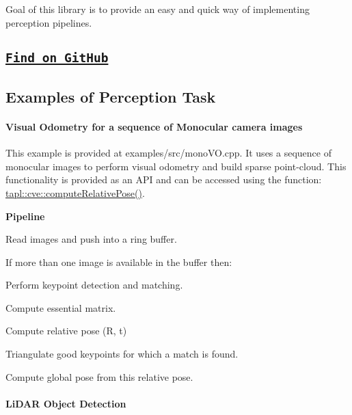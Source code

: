 Goal of this library is to provide an easy and quick way of implementing perception pipelines.



\subsection*{\href{https://github.com/towardsautonomy/TAPL}{\tt {\bfseries Find on Git\+Hub}}}

\subsection*{Examples of Perception Task}

\paragraph*{Visual Odometry for a sequence of Monocular camera images}

This example is provided at {\ttfamily examples/src/mono\+V\+O.\+cpp}. It uses a sequence of monocular images to perform visual odometry and build sparse point-\/cloud. This functionality is provided as an A\+PI and can be accessed using the function\+: {\ttfamily \hyperlink{namespacetapl_1_1cve_ad8314ef8898d3a90c6d93a514bf75d20}{tapl\+::cve\+::compute\+Relative\+Pose()}}.

{\bfseries Pipeline}


\begin{DoxyItemize}
\item Read images and push into a ring buffer.
\item If more than one image is available in the buffer then\+:
\begin{DoxyItemize}
\item Perform keypoint detection and matching.
\item Compute essential matrix.
\item Compute relative pose (R, t)
\item Triangulate good keypoints for which a match is found.
\end{DoxyItemize}
\item Compute global pose from this relative pose.
\end{DoxyItemize}



\paragraph*{Li\+D\+AR Object Detection}

